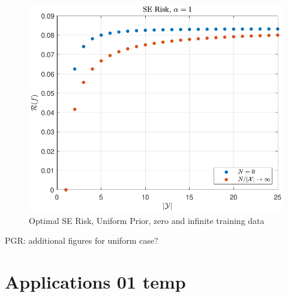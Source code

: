 \documentclass[12pt]{report}
\DeclareMathOperator{\Xcal}{\mathcal{X}}
\begin{document}
\begin{figure}
\centering
\includegraphics[scale=1.0]{Risk_SE_uniform_N_lim.pdf}
\caption{Optimal SE Risk, Uniform Prior, zero and infinite training data}
\label{fig:Risk_SE_uniform_N_lim}
\end{figure}


PGR: additional figures for uniform case?

%
%














\newpage

\section{Applications 01 temp}
\end{document}
